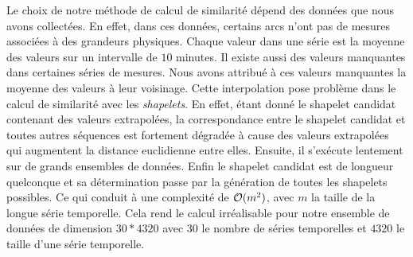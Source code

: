 Le choix de notre m\'ethode de calcul de similarit\'e d\'epend des donn\'ees que nous avons collect\'ees. En effet, dans ces donn\'ees, certains arcs n'ont pas de mesures associ\'ees \`a des grandeurs physiques. Chaque valeur dans une s\'erie est la moyenne des valeurs sur un intervalle de $10$ minutes. 
Il existe aussi des valeurs manquantes dans certaines s\'eries de mesures. Nous avons attribu\'e \`a ces valeurs manquantes la moyenne des valeurs \`a leur voisinage. Cette interpolation pose probl\`eme dans le calcul de similarit\'e avec les {\em shapelets}.
 En effet, \'etant donn\'e le shapelet candidat contenant des valeurs extrapol\'ees, la correspondance entre le shapelet candidat et toutes autres s\'equences est fortement d\'egrad\'ee \`a cause des valeurs extrapol\'ees qui augmentent la distance euclidienne entre elles. Ensuite, il s'ex\'ecute lentement sur de grands ensembles de donn\'ees. Enfin le shapelet candidat est de longueur quelconque et sa d\'etermination passe par la g\'en\'eration de toutes les shapelets possibles. 
 Ce qui conduit \`a une complexit\'e de ${\cal O}(m^2)$, avec $m$ la taille de la longue s\'erie temporelle. 
 Cela rend le calcul irr\'ealisable pour notre ensemble de donn\'ees de dimension $30 * 4320$ avec $30$ le nombre de s\'eries temporelles et $4320$ le taille d'une s\'erie temporelle.
\newline

